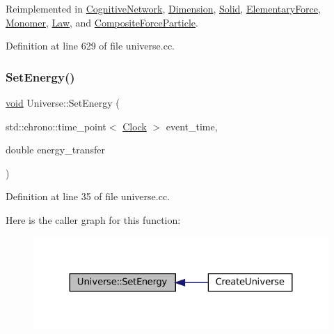 Reimplemented in \mbox{\hyperlink{class_cognitive_network_a270f6842ec14b3e5b80dedf7b48ea6f4}{Cognitive\+Network}}, \mbox{\hyperlink{class_dimension_aead73fc6a25388d14b514b2170735b1b}{Dimension}}, \mbox{\hyperlink{class_solid_a6617ae9fe4707d760a23b54eddf00dec}{Solid}}, \mbox{\hyperlink{class_elementary_force_af4f12038c33d7edf9f13339fcd632ec9}{Elementary\+Force}}, \mbox{\hyperlink{class_monomer_aa034728b74053ed3df452ddc8f1b46e8}{Monomer}}, \mbox{\hyperlink{class_law_aca9bb82839ddb46bd89f52b6211c5a54}{Law}}, and \mbox{\hyperlink{class_composite_force_particle_ad53c5d396b3c56241174a9bd78f9e07a}{Composite\+Force\+Particle}}.



Definition at line 629 of file universe.\+cc.

\mbox{\label{class_universe_a868250e67d0fcb2483aa8bdd73c40a02}} 
\subsubsection{\texorpdfstring{Set\+Energy()}{SetEnergy()}}
{\footnotesize\ttfamily \mbox{\hyperlink{glad_8h_a950fc91edb4504f62f1c577bf4727c29}{void}} Universe\+::\+Set\+Energy (\begin{DoxyParamCaption}\item[{std\+::chrono\+::time\+\_\+point$<$ \mbox{\hyperlink{universe_8h_a0ef8d951d1ca5ab3cfaf7ab4c7a6fd80}{Clock}} $>$}]{event\+\_\+time,  }\item[{double}]{energy\+\_\+transfer }\end{DoxyParamCaption})}



Definition at line 35 of file universe.\+cc.

Here is the caller graph for this function\+:\nopagebreak
\begin{figure}[H]
\begin{center}
\leavevmode
\includegraphics[width=324pt]{class_universe_a868250e67d0fcb2483aa8bdd73c40a02_icgraph}
\end{center}
\end{figure}
\mbox{\label{class_universe_ae0cb8d86b2fbb8396d605160344b42f5}} 
